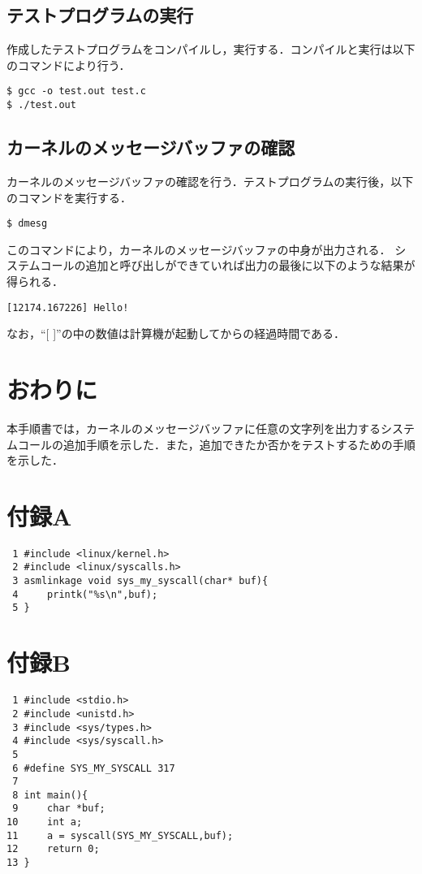 \documentclass[12pt]{jsarticle}
\begin{document}
\subsection{テストプログラムの実行}\label{subsec:execute test program}
作成したテストプログラムをコンパイルし，実行する．コンパイルと実行は以下のコマンドにより行う．
\begin{verbatim}
$ gcc -o test.out test.c
$ ./test.out
\end{verbatim}

\subsection{カーネルのメッセージバッファの確認}\label{subsec:check buffer}
カーネルのメッセージバッファの確認を行う．テストプログラムの実行後，以下のコマンドを実行する．
\begin{verbatim}
$ dmesg
\end{verbatim}
このコマンドにより，カーネルのメッセージバッファの中身が出力される．
システムコールの追加と呼び出しができていれば出力の最後に以下のような結果が得られる．
\begin{verbatim}
[12174.167226] Hello!
\end{verbatim}
なお，``[ ]''の中の数値は計算機が起動してからの経過時間である．

\section{おわりに}\label{sec:conclusion}
本手順書では，カーネルのメッセージバッファに任意の文字列を出力するシステムコールの追加手順を示した．また，追加できたか否かをテストするための手順を示した．

\section*{付録A}\label{appendix A}
\begin{verbatim}
 1 #include <linux/kernel.h>
 2 #include <linux/syscalls.h>
 3 asmlinkage void sys_my_syscall(char* buf){
 4     printk("%s\n",buf);
 5 }
\end{verbatim}

\section*{付録B}\label{appendix B}
\begin{verbatim}
 1 #include <stdio.h>
 2 #include <unistd.h>
 3 #include <sys/types.h>
 4 #include <sys/syscall.h>
 5
 6 #define SYS_MY_SYSCALL 317
 7
 8 int main(){
 9     char *buf;
10     int a;
11     a = syscall(SYS_MY_SYSCALL,buf);
12     return 0;
13 }
\end{verbatim}
\end{document}
